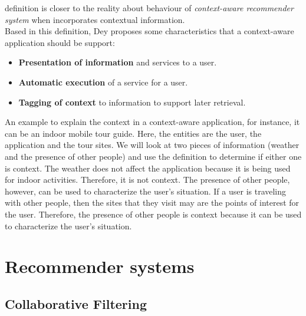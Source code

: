 definition is closer  to the reality about behaviour of \textit
{context-aware recommender system} when incorporates contextual
information.\\  
Based in this definition, Dey proposes some characteristics 
that a context-aware application should be support:
\begin{itemize}  
\item \textbf{Presentation of information} and services to a user.
\item \textbf{Automatic execution} of a service for a user.
\item \textbf{Tagging of context} to information to support later retrieval.
\end{itemize} 
An example to explain the context in a context-aware application, for
instance, it can be an indoor mobile tour guide. Here, the entities
are the user, the application and the tour sites. We will look at two
pieces of information (weather and the presence of other people) and
use the definition to determine if either one is context. The weather
does not affect the application because it is being used for indoor activities.
Therefore, it is not context. The presence of other people, however,
can be used to characterize the user’s situation. If a user is
traveling with other people, then the sites that they visit may are
the points of interest for the user. Therefore, the presence of other
people is context because it can be used to characterize the user's
situation.

\section{Recommender systems}

\subsection{Collaborative Filtering}

